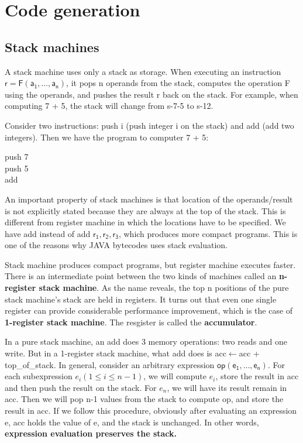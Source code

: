 \ifx\PREAMBLE\undefined


\fi
\chapter{Code generation}
\section{Stack machines}
A stack machine uses only a stack as storage. When executing an instruction $\mathsf{r = F(a_1,\dots,a_n)}$, it pops n operands from the stack, computes the operation F using the operands, and pushes the result r back on the stack. For example, when computing 7 + 5, the stack will change from s-7-5 to s-12. 

Consider two instructions: push i (push integer i on the stack) and add (add two integers). Then we have the program to computer 7 + 5:
\begin{center}
push 7\\push 5\\add
\end{center}
An important property of stack machines is that location of the operands/result is not explicitly stated because they are always at the top of the stack. This is different from register machine in which the locations have to be specified. We have \textsf{add} instead of \textsf{add} $\mathsf{r_1, r_2, r_3}$, which produces more compact programs. This is one of the reasons why JAVA bytecodes uses stack evaluation.

Stack machine produces compact programs, but register machine executes faster. There is an intermediate point between the two kinds of machines called an \textbf{n-register stack machine}. As the name reveals, the top n positions of the pure stack machine's stack are held in registers. It turns out that even one single register can provide considerable performance improvement, which is the case of \textbf{1-register stack machine}. The resgister is called the \textbf{accumulator}. 

In a pure stack machine, an add does 3 memory operations: two reads and one write. But in a 1-register stack machine, what add does is acc$\leftarrow$acc + top\_of\_stack. In general, consider an arbitrary expression $\mathsf{op(e_1,\dots,e_n)}$. For each subexpression $e_i(1\leq i\leq n-1)$, we will compute $e_i$, store the result in acc and then push the result on the stack. For $e_n$, we will have its result remain in acc. Then we will pop n-1 values from the stack to compute op, and store the result in acc. If we follow this procedure, obviously after evaluating an expression e, acc holds the value of e, and the stack is unchanged. In other words, \textbf{expression evaluation preserves the stack.}

